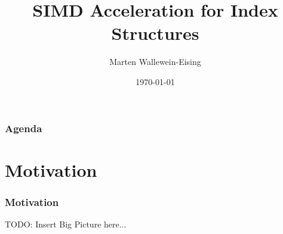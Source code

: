 \documentclass{beamer}
\title{SIMD Acceleration for Index Structures}
\author{Marten Wallewein-Eising}
\date{\today}
\institute{Otto von Guericke Univerity, Magdeburg}
\begin{document}
\begin{frame}[plain]
 \titlepage
\end{frame}



\section[Agenda]{}
\begin{frame}
\frametitle{Agenda}
\tableofcontents
\end{frame}

\section{Motivation}
\begin{frame}
\frametitle{Motivation}
TODO: Insert Big Picture here...
\end{frame}
\end{document}
